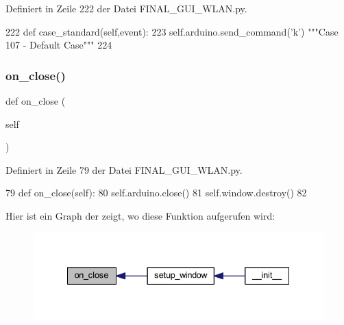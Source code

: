 Definiert in Zeile 222 der Datei F\+I\+N\+A\+L\+\_\+\+G\+U\+I\+\_\+\+W\+L\+A\+N.\+py.


\begin{DoxyCode}
222     \textcolor{keyword}{def }case\_standard(self,event):
223         self.arduino.send\_command(\textcolor{stringliteral}{'k'})  \textcolor{stringliteral}{"""Case 107 - Default Case"""}
224     
\end{DoxyCode}
\mbox{\label{class_f_i_n_a_l___g_u_i___w_l_a_n_1_1_w_l_a_n_a7e20a417210b832ce9e307ce5dc0f2a8}} 
\subsubsection{\texorpdfstring{on\+\_\+close()}{on\_close()}}
{\footnotesize\ttfamily def on\+\_\+close (\begin{DoxyParamCaption}\item[{}]{self }\end{DoxyParamCaption})}



Definiert in Zeile 79 der Datei F\+I\+N\+A\+L\+\_\+\+G\+U\+I\+\_\+\+W\+L\+A\+N.\+py.


\begin{DoxyCode}
79     \textcolor{keyword}{def }on\_close(self):
80         self.arduino.close()
81         self.window.destroy()
82     
\end{DoxyCode}
Hier ist ein Graph der zeigt, wo diese Funktion aufgerufen wird\+:
\nopagebreak
\begin{figure}[H]
\begin{center}
\leavevmode
\includegraphics[width=335pt]{class_f_i_n_a_l___g_u_i___w_l_a_n_1_1_w_l_a_n_a7e20a417210b832ce9e307ce5dc0f2a8_icgraph}
\end{center}
\end{figure}
\mbox{\label{class_f_i_n_a_l___g_u_i___w_l_a_n_1_1_w_l_a_n_acf1affbfdbdb68b3abc9033871a107d0}} 
